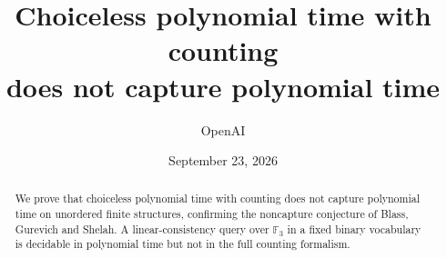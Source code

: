 \documentclass[11pt]{article}
\title{Choiceless polynomial time with counting\\does not capture polynomial time}
\author{OpenAI}
\date{September 23, 2026}
\theoremstyle{definition}
\theoremstyle{remark}
\begin{document}
\maketitle
\begin{abstract}
We prove that choiceless polynomial time with counting does not capture
polynomial time on unordered finite structures, confirming the noncapture
conjecture of Blass, Gurevich and Shelah. A linear-consistency query over
$\mathbb F_3$ in a fixed binary vocabulary is decidable in polynomial time
but not in the full counting formalism.
\end{abstract}
\tableofcontents
\clearpage








\clearpage


\end{document}
